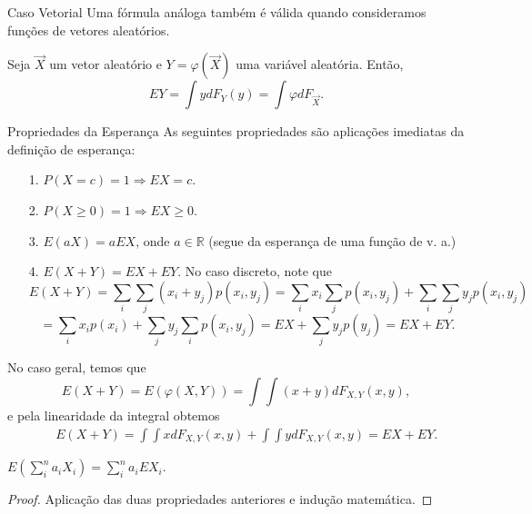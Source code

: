 \begin{frame}
\begin{block}{Caso Vetorial}
%
Uma fórmula análoga também é válida quando consideramos funções de vetores aleatórios.
\end{block}

\begin{teo}Seja $\vec{X}$ um vetor aleatório e $Y=\varphi(\vec{X})$ uma variável aleatória. Então,
$$EY=\int ydF_Y(y)=\int \varphi dF_{\vec{X}}.$$
\end{teo}
%
%
%
\begin{block}{Propriedades da Esperança}
%
As seguintes propriedades são aplicações imediatas da definição de
esperança:
\begin{itemize}
\item[1.] $P(X=c)=1\Rightarrow EX=c$.
\item[2.] $P(X\geq 0)=1\Rightarrow EX\geq 0$.
\item[3.] $E(aX)=aEX$, onde $a \in \mathbb{R}$ (segue da esperança de uma função
de v. a.)
\end{itemize}
%


\end{block}
\end{frame}
%
\begin{frame}
\begin{itemize}
\item[4.] $E(X+Y)=EX+EY$.
No caso discreto, note que
$$ E(X+Y)=\sum_i\sum_j(x_i+y_j)p(x_i,y_j) =\sum_i
x_i\sum_jp(x_i,y_j)+\sum_i\sum_jy_jp(x_i,y_j)$$ $$=\sum_i x_ip(x_i)+\sum_j y_j\sum_ip(x_i,y_j)=EX+\sum_j
y_jp(y_j)=EX+EY.
$$


\end{itemize}
No caso geral, temos que
$$E(X+Y)=E(\varphi(X,Y))=\int\int(x+y)dF_{X,Y}(x,y),$$
e pela linearidade da integral obtemos
\begin{eqnarray}
& & E(X+Y)=\int\int xdF_{X,Y}(x,y)+\int\int ydF_{X,Y}(x,y)=EX+EY.\nonumber
\end{eqnarray}
%
%
\begin{corol}
$E(\sum_i^n a_iX_i)=\sum_i^n a_iEX_i.$
\end{corol}
%
\begin{proof}
Aplicação das duas propriedades anteriores e indução matemática.
\end{proof}
%
\end{frame}
